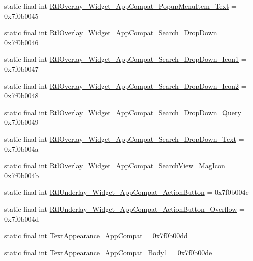 \begin{CompactItemize}
\item 
static final int \hyperlink{classandroid_1_1support_1_1v7_1_1cardview_1_1_r_1_1style_7b8ed350159d8f1c48dc9e66184ebd04}{RtlOverlay\_\-Widget\_\-AppCompat\_\-PopupMenuItem\_\-Text} = 0x7f0b0045
\item 
static final int \hyperlink{classandroid_1_1support_1_1v7_1_1cardview_1_1_r_1_1style_1f8cd0e6cac425737983dbf0d155d3d6}{RtlOverlay\_\-Widget\_\-AppCompat\_\-Search\_\-DropDown} = 0x7f0b0046
\item 
static final int \hyperlink{classandroid_1_1support_1_1v7_1_1cardview_1_1_r_1_1style_dbb03a96b541ef05678524b1914bf4f5}{RtlOverlay\_\-Widget\_\-AppCompat\_\-Search\_\-DropDown\_\-Icon1} = 0x7f0b0047
\item 
static final int \hyperlink{classandroid_1_1support_1_1v7_1_1cardview_1_1_r_1_1style_84956cb6bd309e08ae35e2d7a5e7baba}{RtlOverlay\_\-Widget\_\-AppCompat\_\-Search\_\-DropDown\_\-Icon2} = 0x7f0b0048
\item 
static final int \hyperlink{classandroid_1_1support_1_1v7_1_1cardview_1_1_r_1_1style_dab77f17e07376d388125aa35201f618}{RtlOverlay\_\-Widget\_\-AppCompat\_\-Search\_\-DropDown\_\-Query} = 0x7f0b0049
\item 
static final int \hyperlink{classandroid_1_1support_1_1v7_1_1cardview_1_1_r_1_1style_5a5403f1da3a8ae7c6a8f584757dbb34}{RtlOverlay\_\-Widget\_\-AppCompat\_\-Search\_\-DropDown\_\-Text} = 0x7f0b004a
\item 
static final int \hyperlink{classandroid_1_1support_1_1v7_1_1cardview_1_1_r_1_1style_53c19813a642f6c563b24e545d84097e}{RtlOverlay\_\-Widget\_\-AppCompat\_\-SearchView\_\-MagIcon} = 0x7f0b004b
\item 
static final int \hyperlink{classandroid_1_1support_1_1v7_1_1cardview_1_1_r_1_1style_2af4e71e4e8b9b720cdb306025f57c9f}{RtlUnderlay\_\-Widget\_\-AppCompat\_\-ActionButton} = 0x7f0b004c
\item 
static final int \hyperlink{classandroid_1_1support_1_1v7_1_1cardview_1_1_r_1_1style_39e0e36a2a7c1e69527bcc946c961085}{RtlUnderlay\_\-Widget\_\-AppCompat\_\-ActionButton\_\-Overflow} = 0x7f0b004d
\item 
static final int \hyperlink{classandroid_1_1support_1_1v7_1_1cardview_1_1_r_1_1style_237a3c812413cf9820122db4fcbbedc3}{TextAppearance\_\-AppCompat} = 0x7f0b00dd
\item 
static final int \hyperlink{classandroid_1_1support_1_1v7_1_1cardview_1_1_r_1_1style_a20eeaa8be8d6f70066ab2a831058110}{TextAppearance\_\-AppCompat\_\-Body1} = 0x7f0b00de
\item 

\end{CompactItemize}
